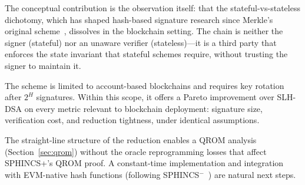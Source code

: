\documentclass[11pt]{article}
\begin{document}
The conceptual contribution is the observation itself: that the
stateful-vs-stateless dichotomy, which has shaped hash-based signature
research since Merkle's original scheme~\cite{xmss}, dissolves in the
blockchain setting. The chain is neither the signer (stateful) nor an
unaware verifier (stateless)---it is a third party that enforces the
state invariant that stateful schemes require, without trusting the
signer to maintain it.

The scheme is limited to account-based blockchains and requires key
rotation after $2^H$ signatures. Within this scope, it offers a
Pareto improvement over SLH-DSA on every metric relevant to blockchain
deployment: signature size, verification cost, and reduction tightness,
under identical assumptions.

The straight-line structure of the reduction enables a QROM analysis
(Section~\ref{sec:qrom}) without the oracle reprogramming losses that
affect SPHINCS+'s QROM proof. A constant-time implementation and
integration with EVM-native hash functions (following
SPHINCS$^-$~\cite{sphincsminus}) are natural next steps.
\end{document}

